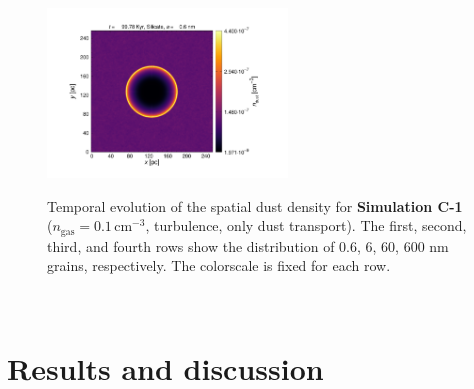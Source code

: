 \documentclass[fleqn,usenatbib]{mnras}
\begin{document}
\begin{figure}
 \includegraphics[trim=5.2cm 1.5cm 3.2cm 2.0cm, clip=true,page=4,height = 4.5cm]{Pics/Pics_C1/Density_1_00400.pdf}\\
  \caption{Temporal evolution of the spatial dust density for \textbf{Simulation C-1} ($n_\text{gas}=0.1\,\text{cm}^{-3}$, turbulence, only dust transport). The first, second, third, and fourth rows show the distribution of 0.6, 6, 60, 600 nm grains, respectively. The colorscale is fixed for each row.}
  \end{figure}  
 
\newpage~
\newpage~
\newpage~
\newpage
\section{Results and discussion}
\end{document}
